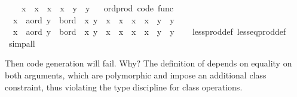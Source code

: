 \begin{isabellebody}
\ \ \ \ x{}\ {\isacharless}\ x{}\ {\isasymor}\ {\isacharparenleft}x{}\ {\isacharequal}\ x{}\ {\isasymand}\ y{}\ {\isasymle}\ y{}{\isacharparenright}{\isacharparenright}{\isachardoublequoteclose}\isanewline
\isanewline
{}\isamarkupfalse%
%
\isadelimproof
\ %
\endisadelimproof
%
\isatagproof
\isacommand{{\isachardot}{\isachardot}}\isamarkupfalse%
%
\endisatagproof
{\isafoldproof}%
%
\isadelimproof
%
\endisadelimproof
\isanewline
\isanewline
{}\isamarkupfalse%
\isanewline
\isanewline
{}\isamarkupfalse%
\ ord{\isacharunderscore}prod\ {\isacharbrackleft}code\ func{\isacharbrackright}{\isacharcolon}\isanewline
\ \ {\isachardoublequoteopen}{\isacharparenleft}x{}\ {\isasymColon}\ {\isacharprime}a{\isasymColon}ord{\isacharcomma}\ y{}\ {\isasymColon}\ {\isacharprime}b{\isasymColon}ord{\isacharparenright}\ {\isacharless}\ {\isacharparenleft}x{}{\isacharcomma}\ y{}{\isacharparenright}\ {\isasymlongleftrightarrow}\ x{}\ {\isacharless}\ x{}\ {\isasymor}\ {\isacharparenleft}x{}\ {\isacharequal}\ x{}\ {\isasymand}\ y{}\ {\isacharless}\ y{}{\isacharparenright}{\isachardoublequoteclose}\isanewline
\ \ {\isachardoublequoteopen}{\isacharparenleft}x{}\ {\isasymColon}\ {\isacharprime}a{\isasymColon}ord{\isacharcomma}\ y{}\ {\isasymColon}\ {\isacharprime}b{\isasymColon}ord{\isacharparenright}\ {\isasymle}\ {\isacharparenleft}x{}{\isacharcomma}\ y{}{\isacharparenright}\ {\isasymlongleftrightarrow}\ x{}\ {\isacharless}\ x{}\ {\isasymor}\ {\isacharparenleft}x{}\ {\isacharequal}\ x{}\ {\isasymand}\ y{}\ {\isasymle}\ y{}{\isacharparenright}{\isachardoublequoteclose}\isanewline
%
\isadelimproof
\ \ %
\endisadelimproof
%
\isatagproof
{}\isamarkupfalse%
\ less{\isacharunderscore}prod{\isacharunderscore}def\ less{\isacharunderscore}eq{\isacharunderscore}prod{\isacharunderscore}def\ \isamarkupfalse%
\ simp{\isacharunderscore}all%
\endisatagproof
{\isafoldproof}%
%
\isadelimproof
%
\endisadelimproof
%
\begin{isamarkuptext}%
Then code generation will fail.  Why?  The definition
  of  depends on equality on both arguments,
  which are polymorphic and impose an additional 
  class constraint, thus violating the type discipline
  for class operations.


\end{isamarkuptext}
\end{isabellebody}
